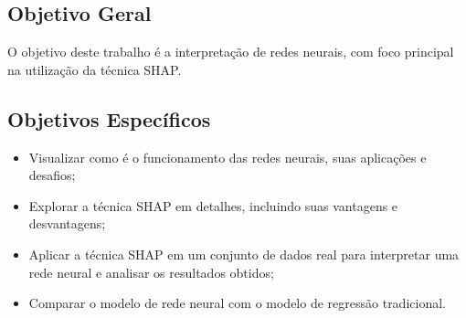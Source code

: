 \subsection{Objetivo Geral}

O objetivo deste trabalho é a interpretação de  redes neurais, com foco principal na utilização da técnica SHAP.


\subsection{Objetivos Específicos}

\begin{itemize}
    \item Visualizar como é o funcionamento das redes neurais, suas aplicações e desafios;
    \item Explorar a técnica SHAP em detalhes, incluindo suas vantagens e desvantagens;
    \item Aplicar a técnica SHAP em um conjunto de dados real para interpretar uma rede neural e analisar os resultados obtidos;
    \item Comparar o modelo de rede neural com o modelo de regressão tradicional.

\end{itemize}

